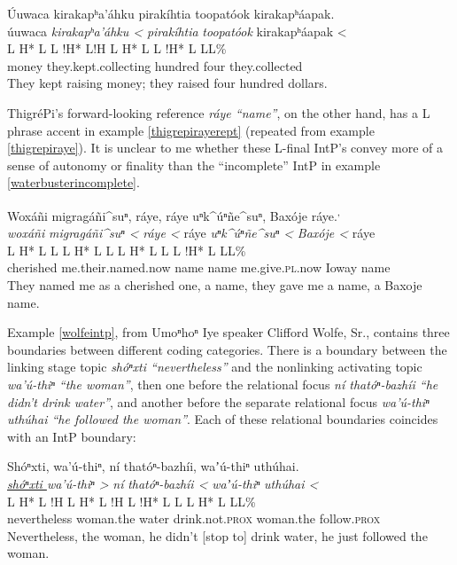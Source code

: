 \documentclass[output=paper]{LSP/langsci}
\begin{document}
\ea\label{waterbusterincomplete}
 	Úuwaca kirakapʰa’áhku pirakíhtia toopatóok kirakapʰáapak.\footnotemark\\
\glll	úuwaca	\emph{kirakapʰa’áhku <}		\emph{pirakíhtia}	\emph{toopatóok}	{kirakapʰáapak <}\\
	{\ob L H* L}	{L !H* L!H\cb}	{\ob L H* L}		{}			{L !H* L L\cb{}L\%}\\
	money	they.kept.collecting			hundred		four			they.collected\\
\glt	They kept raising money; they raised four hundred dollars.
\z

ThigréPi’s forward-looking reference \emph{ráye “name”}, on the other hand, has a L phrase accent in example \ref{thigrepirayerept} (repeated from example \ref{thigrepiraye}). It is unclear to me whether these L-final IntP’s convey more of a sense of autonomy or finality than the “incomplete” IntP in example \ref{waterbusterincomplete}.

\ea\label{thigrepirayerept}
Woxáñi migragáñi\^{}suⁿ, ráye, ráye uⁿk\^{}úⁿñe\^{}suⁿ, Baxóje ráye.\footnotemark\textsuperscript{,} \footnotemark\\
\glll	\emph{woxáñi} 	\emph{migragáñi\^{}suⁿ <}		\emph{ráye <}	ráye		\emph{uⁿk\^{}úⁿñe\^{}suⁿ <}	\emph{Baxóje <}		ráye\\
	{\ob L H* L}		{L\cb}	{\ob L H* L L\cb}	{\ob L H* L}	{L\cb}	{\ob L !H* L} 		{L\cb{}L\%}\\
	cherished		me.their.named.now			name			name		me.give.\textsc{pl}.now		Ioway				name\\
\glt	They named me as a cherished one, a name, they gave me a name, a Baxoje name.
\z

Example \ref{wolfeintp}, from Umoⁿhoⁿ Iye speaker Clifford Wolfe, Sr., contains three boundaries between different coding categories. There is a boundary between the linking stage topic \emph{shóⁿxti “nevertheless”} and the nonlinking activating topic \emph{wa’ú-thiⁿ “the woman”}, then one before the relational focus \emph{ní thatóⁿ-bazhíi “he didn’t drink water”}, and another before the separate relational focus \emph{wa’ú-thiⁿ uthúhai “he followed the woman”}. Each of these relational boundaries coincides with an IntP boundary:

\ea\label{wolfeintp}
 	Shóⁿxti, wa’ú-thiⁿ, ní thatóⁿ-bazhíi, waʼú-thiⁿ uthúhai.\footnotemark\\
\glll	\emph{\underline{shóⁿxti }}	\emph{wa’ú-thiⁿ >}		\emph{ní} 		\emph{thatóⁿ-bazhíi <}		\emph{waʼú-thiⁿ} 	\emph{uthúhai <}\\
	{\ob L H* L !H\cb}			{\ob L H* L !H\cb}		{\ob L}		{!H* L L\cb}	{\ob L H* L}		{L\cb{}L\%}\\
	nevertheless				woman.the			water			drink.not.\textsc{prox} 		woman.the		follow.\textsc{prox}\\
\glt	Nevertheless, the woman, he didn’t [stop to] drink water, he just followed the woman. 
\z
\end{document}
